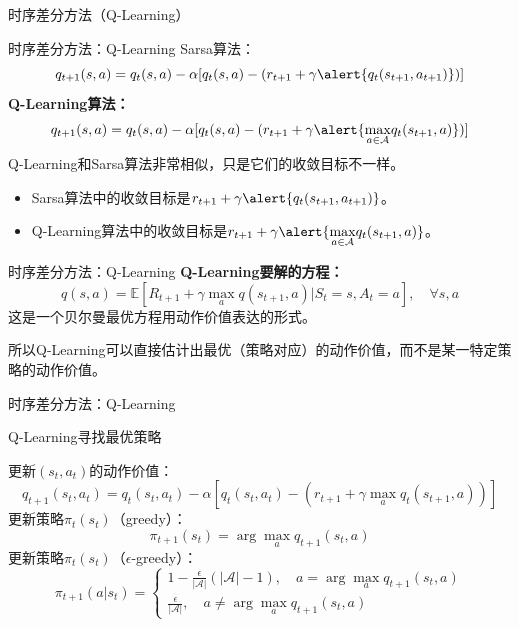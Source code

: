 \begin{section}{时序差分方法\alert{（Q-Learning）}}
\begin{frame}{时序差分方法：Q-Learning}
    Sarsa算法：
    \[
        q_{t+1}(s,a)=q_t(s,a)-\alpha[q_t(s,a)-(r_{t+1}+\gamma \alert{q_t(s_{t+1},a_{t+1})})]
    \]
    \textbf{Q-Learning算法：}
    \[
        q_{t+1}(s,a)=q_t(s,a)-\alpha[q_t(s,a)-(r_{t+1}+\gamma \alert{\underset{a\in\mathcal{A}}{\max}q_t(s_{t+1},a)})]
    \]
    Q-Learning和Sarsa算法非常相似，只是它们的收敛目标不一样。
    \begin{itemize}
        \item Sarsa算法中的收敛目标是$r_{t+1}+\gamma \alert{q_t(s_{t+1},a_{t+1})}$。
        \item Q-Learning算法中的收敛目标是$r_{t+1}+\gamma \alert{\underset{a\in\mathcal{A}}{\max}q_t(s_{t+1},a)}$。
    \end{itemize}
\end{frame}

\begin{frame}{时序差分方法：Q-Learning}
    \textbf{Q-Learning要解的方程：}
    \[
        q(s,a)=\mathbb{E}[R_{t+1}+\gamma\underset{a}{\max}q(s_{t+1}, a)| S_t=s, A_t=a], \quad \forall s,a
    \]
    这是一个贝尔曼\alert{最优}方程用动作价值表达的形式。

    所以Q-Learning可以直接估计出\alert{最优（策略对应）的动作价值}，而不是某一特定策略的动作价值。
\end{frame}

\begin{frame}{时序差分方法：Q-Learning}
    \vspace{-0.2cm}
    \begin{block}{Q-Learning寻找最优策略}
        \begin{algorithmic}[1]
            \setlength{\baselineskip}{0.5\baselineskip}
                \State 更新$(s_t, a_t)$的动作价值：
                \[
                    q_{t+1}(s_t,a_t)=q_t(s_t,a_t)-\alpha[q_t(s_t,a_t)-(r_{t+1}+\gamma \underset{a}{\max}q_t(s_{t+1},a))]
                \]
                \State 更新策略$\pi_t(s_t)$（greedy）：
                \[
                    \pi_{t+1}(s_t)=\arg\max_a q_{t+1}(s_t,a)
                \]
                \State 更新策略$\pi_t(s_t)$（$\epsilon$-greedy）：
                \[
                    \pi_{t+1}(a|s_{t})=\begin{cases}
                        1-\frac{\epsilon}{|\mathcal{A}|}(|\mathcal{A}|-1),\quad a=\arg\max_{a}q_{t+1}(s_t,a) \\
                        \frac{\epsilon}{|\mathcal{A}|},\quad a \neq \arg\max_{a}q_{t+1}(s_t,a)
                    \end{cases}
                \]
            \EndFor
        \end{algorithmic}
    \end{block}
\end{frame}


\end{section}
